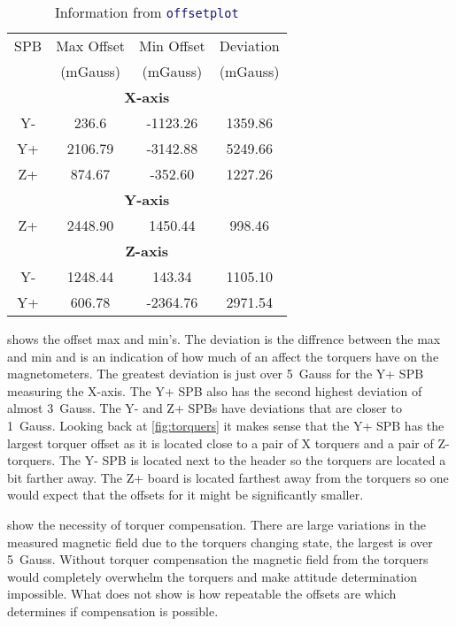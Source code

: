  
\begin{table}[!ht]
    \centering
    \caption{Information from \lstinline[style=code,language=Matlab]$offsetplot$}
    \label{tab:off-stat}
    \begin{tabular}{|c|c|c|c|}
        \hline
        \acs{SPB}&Max Offset&Min Offset&Deviation\\
        &(mGauss)&(mGauss)&(mGauss)\\
        \hline
        \multicolumn{4}{|c|}{\bfseries X-axis}\\
        \hline
        Y-&236.6&-1123.26&1359.86\\
        \hline
        Y+&2106.79&-3142.88&5249.66\\
        \hline
        Z+&874.67&-352.60&1227.26\\
        \hline
        \multicolumn{4}{|c|}{\bfseries Y-axis}\\
        \hline
        Z+&2448.90&1450.44&998.46\\
        \hline
        \multicolumn{4}{|c|}{\bfseries Z-axis}\\
        \hline
        Y-&1248.44&143.34&1105.10\\
        \hline
        Y+&606.78&-2364.76&2971.54\\
        \hline
    \end{tabular}
\end{table}

 shows the offset max and min's. The deviation is the diffrence between the max and min and is an indication of how much of an affect the torquers have on the magnetometers. The greatest deviation is just over 5~Gauss for the Y+ \ac{SPB} measuring the X-axis. The Y+ \ac{SPB} also has the second highest deviation of almost 3~Gauss. The Y- and Z+ \acp{SPB} have deviations that are closer to 1~Gauss. Looking back at \cref{fig:torquers} it makes sense that the Y+ \ac{SPB} has the largest torquer offset as it is located close to a pair of X torquers and a pair of Z-torquers. The Y- \ac{SPB} is located next to the header so the torquers are located a bit farther away. The Z+ board is located farthest away from the torquers so one would expect that the offsets for it might be significantly smaller.


 show the necessity of torquer compensation. There are large variations in the measured magnetic field due to the torquers changing state, the largest is over 5~Gauss. Without torquer compensation the magnetic field from the torquers would completely overwhelm the torquers and make attitude determination impossible. What  does not show is how repeatable the offsets are which determines if compensation is possible.


